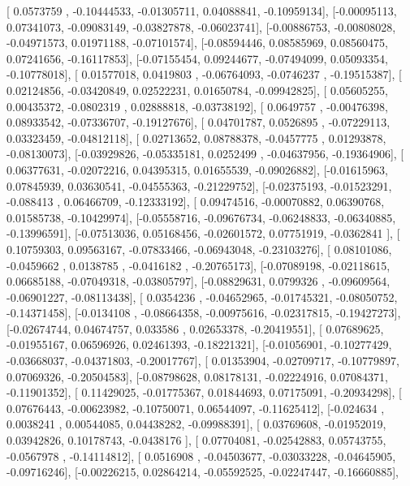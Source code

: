 \documentclass{article}
\begin{document}
       [ 0.0573759 , -0.10444533, -0.01305711,  0.04088841, -0.10959134],
       [-0.00095113,  0.07341073, -0.09083149, -0.03827878, -0.06023741],
       [-0.00886753, -0.00808028, -0.04971573,  0.01971188, -0.07101574],
       [-0.08594446,  0.08585969,  0.08560475,  0.07241656, -0.16117853],
       [-0.07155454,  0.09244677, -0.07494099,  0.05093354, -0.10778018],
       [ 0.01577018,  0.0419803 , -0.06764093, -0.0746237 , -0.19515387],
       [ 0.02124856, -0.03420849,  0.02522231,  0.01650784, -0.09942825],
       [ 0.05605255,  0.00435372, -0.0802319 ,  0.02888818, -0.03738192],
       [ 0.0649757 , -0.00476398,  0.08933542, -0.07336707, -0.19127676],
       [ 0.04701787,  0.0526895 , -0.07229113,  0.03323459, -0.04812118],
       [ 0.02713652,  0.08788378, -0.0457775 ,  0.01293878, -0.08130073],
       [-0.03929826, -0.05335181,  0.0252499 , -0.04637956, -0.19364906],
       [ 0.06377631, -0.02072216,  0.04395315,  0.01655539, -0.09026882],
       [-0.01615963,  0.07845939,  0.03630541, -0.04555363, -0.21229752],
       [-0.02375193, -0.01523291, -0.088413  ,  0.06466709, -0.12333192],
       [ 0.09474516, -0.00070882,  0.06390768,  0.01585738, -0.10429974],
       [-0.05558716, -0.09676734, -0.06248833, -0.06340885, -0.13996591],
       [-0.07513036,  0.05168456, -0.02601572,  0.07751919, -0.0362841 ],
       [ 0.10759303,  0.09563167, -0.07833466, -0.06943048, -0.23103276],
       [ 0.08101086, -0.0459662 ,  0.0138785 , -0.0416182 , -0.20765173],
       [-0.07089198, -0.02118615,  0.06685188, -0.07049318, -0.03805797],
       [-0.08829631,  0.0799326 , -0.09609564, -0.06901227, -0.08113438],
       [ 0.0354236 , -0.04652965, -0.01745321, -0.08050752, -0.14371458],
       [-0.0134108 , -0.08664358, -0.00975616, -0.02317815, -0.19427273],
       [-0.02674744,  0.04674757,  0.033586  ,  0.02653378, -0.20419551],
       [ 0.07689625, -0.01955167,  0.06596926,  0.02461393, -0.18221321],
       [-0.01056901, -0.10277429, -0.03668037, -0.04371803, -0.20017767],
       [ 0.01353904, -0.02709717, -0.10779897,  0.07069326, -0.20504583],
       [-0.08798628,  0.08178131, -0.02224916,  0.07084371, -0.11901352],
       [ 0.11429025, -0.01775367,  0.01844693,  0.07175091, -0.20934298],
       [ 0.07676443, -0.00623982, -0.10750071,  0.06544097, -0.11625412],
       [-0.024634  ,  0.0038241 ,  0.00544085,  0.04438282, -0.09988391],
       [ 0.03769608, -0.01952019,  0.03942826,  0.10178743, -0.0438176 ],
       [ 0.07704081, -0.02542883,  0.05743755, -0.0567978 , -0.14114812],
       [ 0.0516908 , -0.04503677, -0.03033228, -0.04645905, -0.09716246],
       [-0.00226215,  0.02864214, -0.05592525, -0.02247447, -0.16660885],
\end{document}
